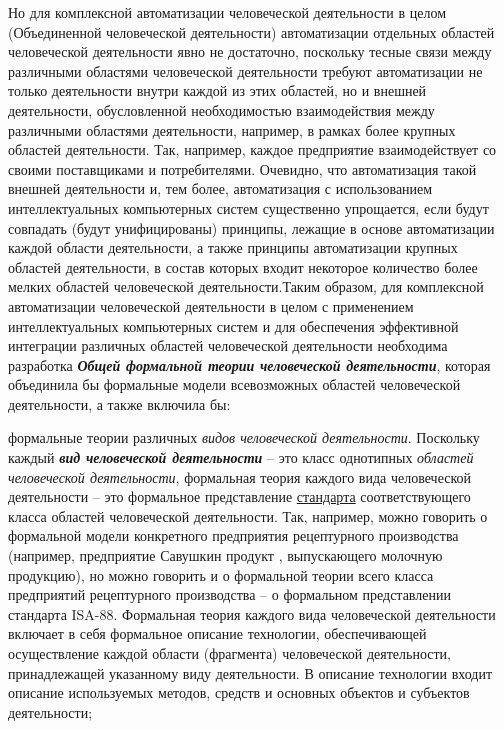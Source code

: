 \begin{scnsubstruct}
{        Но для комплексной автоматизации человеческой деятельности в целом (Объединенной человеческой деятельности) автоматизации отдельных областей человеческой деятельности явно не достаточно, поскольку тесные связи между различными областями человеческой деятельности требуют автоматизации не только деятельности внутри каждой из этих областей, но и внешней деятельности, обусловленной необходимостью взаимодействия между различными областями деятельности, например, в рамках более крупных областей деятельности. Так, например, каждое предприятие взаимодействует со своими поставщиками и потребителями. Очевидно, что автоматизация такой внешней деятельности и, тем более, автоматизация с использованием интеллектуальных компьютерных систем существенно упрощается, если будут совпадать (будут унифицированы) принципы, лежащие в основе автоматизации каждой области деятельности, а также принципы автоматизации крупных областей деятельности, в состав которых входит некоторое количество более мелких областей человеческой деятельности.Таким образом, для комплексной автоматизации человеческой деятельности в целом с применением интеллектуальных компьютерных систем и для обеспечения эффективной интеграции различных областей человеческой деятельности необходима разработка \textbf{\textit{Общей формальной теории человеческой деятельности}}, которая объединила бы формальные модели всевозможных областей человеческой деятельности, а также включила бы:
        \begin{scnitemize}
            \item формальные теории различных \textit{видов человеческой деятельности}. Поскольку каждый \textbf{\textit{вид человеческой деятельности}} -- это класс однотипных \textit{областей человеческой деятельности}, формальная теория каждого вида человеческой деятельности -- это формальное представление \underline{стандарта} соответствующего класса областей человеческой деятельности. Так, например, можно говорить о формальной модели конкретного предприятия рецептурного производства (например, предприятие Савушкин продукт , выпускающего молочную продукцию), но можно говорить и о формальной теории всего класса предприятий рецептурного производства -- о формальном представлении стандарта ISA-88. Формальная теория каждого вида человеческой деятельности включает в себя формальное описание технологии, обеспечивающей осуществление каждой области (фрагмента) человеческой деятельности, принадлежащей указанному виду деятельности. В описание технологии входит описание используемых методов, средств и основных объектов и субъектов деятельности;

\end{scnitemize}}
\end{scnsubstruct}
